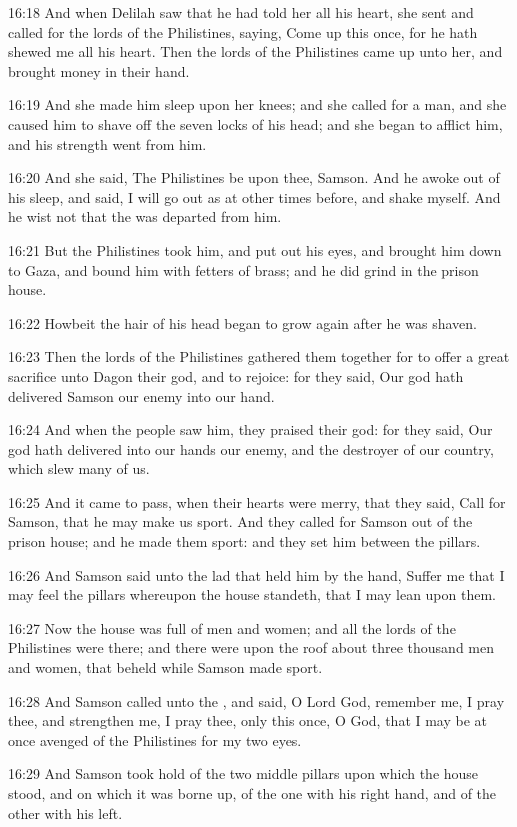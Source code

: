 16:18 And when Delilah saw that he had told her all his heart, she
sent and called for the lords of the Philistines, saying, Come up this
once, for he hath shewed me all his heart. Then the lords of the
Philistines came up unto her, and brought money in their hand.

16:19 And she made him sleep upon her knees; and she called for a man,
and she caused him to shave off the seven locks of his head; and she
began to afflict him, and his strength went from him.

16:20 And she said, The Philistines be upon thee, Samson. And he awoke
out of his sleep, and said, I will go out as at other times before,
and shake myself. And he wist not that the \LORD was departed from him.

16:21 But the Philistines took him, and put out his eyes, and brought
him down to Gaza, and bound him with fetters of brass; and he did
grind in the prison house.

16:22 Howbeit the hair of his head began to grow again after he was
shaven.

16:23 Then the lords of the Philistines gathered them together for to
offer a great sacrifice unto Dagon their god, and to rejoice: for they
said, Our god hath delivered Samson our enemy into our hand.

16:24 And when the people saw him, they praised their god: for they
said, Our god hath delivered into our hands our enemy, and the
destroyer of our country, which slew many of us.

16:25 And it came to pass, when their hearts were merry, that they
said, Call for Samson, that he may make us sport. And they called for
Samson out of the prison house; and he made them sport: and they set
him between the pillars.

16:26 And Samson said unto the lad that held him by the hand, Suffer
me that I may feel the pillars whereupon the house standeth, that I
may lean upon them.

16:27 Now the house was full of men and women; and all the lords of
the Philistines were there; and there were upon the roof about three
thousand men and women, that beheld while Samson made sport.

16:28 And Samson called unto the \LORD, and said, O Lord God, remember
me, I pray thee, and strengthen me, I pray thee, only this once, O
God, that I may be at once avenged of the Philistines for my two eyes.

16:29 And Samson took hold of the two middle pillars upon which the
house stood, and on which it was borne up, of the one with his right
hand, and of the other with his left.

